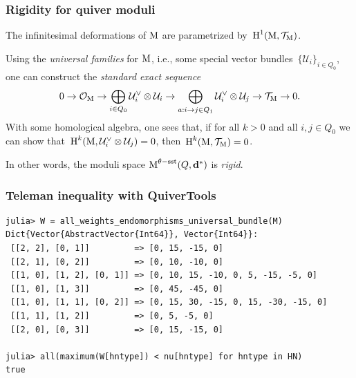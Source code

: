 \documentclass{beamer}
\begin{document}
\begin{frame}
    \frametitle{Rigidity for quiver moduli}
The infinitesimal deformations of $\operatorname{M}$ are parametrized
by~$\operatorname{H}^1(\operatorname{M}, \mathcal{T}_{\operatorname{M}})$. \pause

Using the \emph{universal families} for $\operatorname{M}$, i.e.,
some special vector bundles~$\{\mathcal{U}_i\}_{i \in Q_0}$,
one can construct the \emph{standard exact sequence}
\begin{equation}\label{equation:4-term-exact-sequence}
0
\overset{}{\rightarrow}\mathcal{O}_{\operatorname{M}}
\overset{}{\rightarrow}\bigoplus_{i \in Q_0} \mathcal{U}^\vee_i \otimes \mathcal{U}_i
\overset{}{\rightarrow}\bigoplus_{a: i \overset{}{\rightarrow} j \in Q_1} \mathcal{U}^\vee_{i} \otimes \mathcal{U}_{j}
\overset{}{\rightarrow}\mathcal{T}_{\operatorname{M}}
\overset{}{\rightarrow} 0.
\end{equation} \pause
With some homological algebra, one sees that, if for all $k > 0$ and all $i,j \in Q_0$
we can show that~$\operatorname{H}^k(\operatorname{M}, \mathcal{U}^{\vee}_i \otimes \mathcal{U}_j) = 0$,
then~$\operatorname{H}^k(\operatorname{M}, \mathcal{T}_{\operatorname{M}}) = 0$. \pause

In other words, the moduli space $\operatorname{M}^{\theta-\mathrm{sst}}(Q, \mathbf{d}^*)$
is \emph{rigid}.
\end{frame}

\begin{frame}[fragile]
    \frametitle{Teleman inequality with QuiverTools}
\scriptsize{
\begin{lstlisting}
julia> W = all_weights_endomorphisms_universal_bundle(M)
Dict{Vector{AbstractVector{Int64}}, Vector{Int64}}:
 [[2, 2], [0, 1]]         => [0, 15, -15, 0]
 [[2, 1], [0, 2]]         => [0, 10, -10, 0]
 [[1, 0], [1, 2], [0, 1]] => [0, 10, 15, -10, 0, 5, -15, -5, 0]
 [[1, 0], [1, 3]]         => [0, 45, -45, 0]
 [[1, 0], [1, 1], [0, 2]] => [0, 15, 30, -15, 0, 15, -30, -15, 0]
 [[1, 1], [1, 2]]         => [0, 5, -5, 0]
 [[2, 0], [0, 3]]         => [0, 15, -15, 0]

julia> all(maximum(W[hntype]) < nu[hntype] for hntype in HN)
true
\end{lstlisting}
}
\end{frame}
\end{document}
